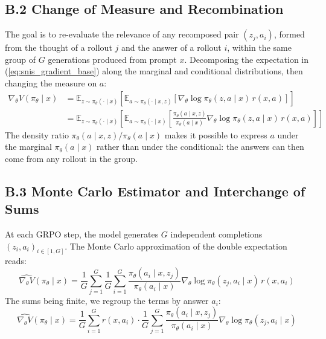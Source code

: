\documentclass[11pt,a4paper]{article}
\begin{document}
\subsection*{B.2 Change of Measure and Recombination}
The goal is to re-evaluate the relevance of any recomposed pair $(z_j, a_i)$, formed from the thought of a rollout $j$ and the answer of a rollout $i$, within the same group of $G$ generations produced from prompt $x$. Decomposing the expectation in (\ref{eq:snis_gradient_base}) along the marginal and conditional distributions, then changing the measure on $a$:
\begin{align}
\nabla_\theta V(\pi_\theta \mid x) &= \mathbb{E}_{z \sim \pi_\theta(\cdot \mid x)} \left[ \mathbb{E}_{a \sim \pi_\theta(\cdot \mid x, z)} \left[ \nabla_\theta \log \pi_\theta(z,a \mid x) \, r(x,a) \right] \right] \\
&= \mathbb{E}_{z \sim \pi_\theta(\cdot \mid x)} \left[ \mathbb{E}_{a \sim \pi_\theta(\cdot \mid x)} \left[ \frac{\pi_\theta(a \mid x, z)}{\pi_\theta(a \mid x)} \nabla_\theta \log \pi_\theta(z,a \mid x) \, r(x,a) \right] \right]
\end{align}
The density ratio $\pi_\theta(a \mid x, z) / \pi_\theta(a \mid x)$ makes it possible to express $a$ under the marginal $\pi_\theta(a \mid x)$ rather than under the conditional: the answers can then come from any rollout in the group.

\subsection*{B.3 Monte Carlo Estimator and Interchange of Sums}
At each GRPO step, the model generates $G$ independent completions $(z_i, a_i)_{i \in [1, G]}$. The Monte Carlo approximation of the double expectation reads:
\begin{equation}
\widehat{\nabla_\theta V}(\pi_\theta \mid x) = \frac{1}{G} \sum_{j=1}^G \frac{1}{G} \sum_{i=1}^G \frac{\pi_\theta(a_i \mid x, z_j)}{\pi_\theta(a_i \mid x)} \nabla_\theta \log \pi_\theta(z_j, a_i \mid x) \, r(x, a_i)
\end{equation}
The sums being finite, we regroup the terms by answer $a_i$:
\begin{equation}
\widehat{\nabla_\theta V}(\pi_\theta \mid x) = \frac{1}{G} \sum_{i=1}^G r(x, a_i) \cdot \frac{1}{G} \sum_{j=1}^G \frac{\pi_\theta(a_i \mid x, z_j)}{\pi_\theta(a_i \mid x)} \nabla_\theta \log \pi_\theta(z_j, a_i \mid x)
\end{equation}
\end{document}
